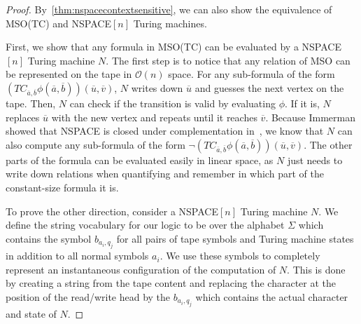 \begin{proof}
    By~\cref{thm:nspacecontextsensitive}, we can also show the equivalence of \acs{MSO}(\acs{TC}) and \acs{NSPACE}$[n]$ Turing machines.

    First, we show that any formula in \acs{MSO}(\acs{TC}) can be evaluated by a \acs{NSPACE}$[n]$ Turing machine $N$.
    The first step is to notice that any relation of \acs{MSO} can be represented on the tape in $\mathcal{O}(n)$ space.
    For any sub-formula of the form $\left(TC_{\overline{a}, \overline{b}}\phi\left(\overline{a}, \overline{b}\right)\right)\left(\overline{u}, \overline{v}\right)$, $N$ writes down $\overline{u}$ and guesses the next vertex on the tape.
    Then, $N$ can check if the transition is valid by evaluating $\phi$.
    If it is, $N$ replaces $\overline{u}$ with the new vertex and repeats until it reaches $\overline{v}$.
    Because Immerman showed that \acs{NSPACE} is closed under complementation in~\cite{Immerman1988}, we know that $N$ can also compute any sub-formula of the form $\neg\left(TC_{\overline{a}, \overline{b}}\phi\left(\overline{a}, \overline{b}\right)\right)\left(\overline{u}, \overline{v}\right)$.
    The other parts of the formula can be evaluated easily in linear space, as $N$ just needs to write down relations when quantifying and remember in which part of the constant-size formula it is.

    \vspace{5mm}

    To prove the other direction, consider a \acs{NSPACE}$[n]$ Turing machine $N$.
    We define the string vocabulary for our logic to be over the alphabet $\Sigma$ which contains the symbol $b_{a_i, q_j}$ for all pairs of tape symbols and Turing machine states in addition to all normal symbols $a_i$.
    We use these symbols to completely represent an instantaneous configuration of the computation of $N$.
    This is done by creating a string from the tape content and replacing the character at the position of the read/write head by the $b_{a_i, q_j}$ which contains the actual character and state of $N$.


\end{proof}
